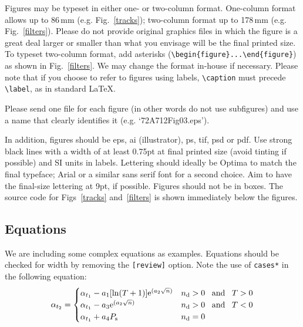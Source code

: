\documentclass[review,jog]{igs}
\begin{document}
Figures may be typeset in either one- or two-column format. One-column format allows up to 86$\,$mm (e.g. Fig.~\ref{tracks}); two-column format up to 178$\,$mm (e.g. Fig.~\ref{filters}). Please do not provide original graphics files in which the figure is a great deal larger or smaller than what you envisage will be the final printed size. To typeset two-column format, add asterisks (\verb"\begin{figure}...\end{figure}") as shown in Fig.~\ref{filters}. We may change the format in-house if necessary. Please note that if you choose to refer to figures using labels, \verb"\caption" must precede \verb"\label", as in standard \LaTeX. 

Please send one file for each figure (in other words do not use subfigures) and use a name that clearly identifies it (e.g. `72A712Fig03.eps').

In addition, figures should be eps, ai (illustrator), ps, tif, psd or pdf. Use strong black lines with a width of at least 0.75pt at final printed size (avoid tinting if possible) and SI units in labels. Lettering should ideally be Optima to match the final typeface; Arial or a similar sans serif font for a second choice. Aim to have the final-size lettering at 9pt, if possible. Figures should not be in boxes. The source code for Figs~\ref{tracks} and~\ref{filters} is shown immediately below the figures.


\subsection{Equations}

We are including some complex equations as examples. Equations should be checked for width by removing the \verb"[review]" option. Note the use of \verb|cases*| in the following equation:
\begin{equation}
\label{arrayexample}
\alpha_{t_2}= %
  \begin{cases}
    \alpha_{t_1} - a_1 [\ln (T+1)]
      \mathrm{e}^{(a_2\sqrt{n})}
      & \mbox{$n_\mathrm{d} > 0\enskip$ and
      $\enskip T > 0$}\\
    \alpha_{t_1} - a_3 \mathrm{e}^{(a_2\sqrt{n})}
      & \mbox{$n_\mathrm{d} > 0\enskip$ and
      $\enskip T < 0$}\\
    \alpha_{t_1} + a_4 P_\mathrm{s}
      & \mbox{$n_\mathrm{d} = 0$}
  \end{cases}
\end{equation}
\end{document}
